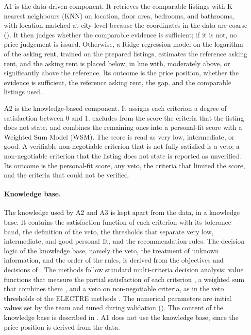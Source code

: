 \documentclass[12pt,a4paper]{report}
\begin{document}
A1 is the data-driven component. It retrieves the comparable listings with
K-nearest neighbours (KNN) on location, floor area, bedrooms, and bathrooms,
with location matched at city level because the coordinates in the data are
coarse (). It then judges whether the comparable evidence is sufficient; if it
is not, no price judgement is issued. Otherwise, a Ridge regression model
on the logarithm of the asking rent, trained on the prepared listings,
estimates the reference asking rent, and the asking rent is placed below,
in line with, moderately above, or significantly above the reference. Its outcome is the price position,
whether the evidence is sufficient, the reference asking rent, the gap, and
the comparable listings used.

A2 is the knowledge-based component. It assigns each criterion a degree of
satisfaction between 0 and 1, excludes from the score the criteria that the
listing does not state, and combines the remaining ones into a personal-fit
score with a Weighted Sum Model (WSM). The score is read as very low,
intermediate, or good. A verifiable non-negotiable criterion that is not
fully satisfied is a veto; a non-negotiable criterion that the listing does
not state is reported as unverified. Its outcome is the personal-fit score,
any veto, the criteria that limited the score, and the criteria that could
not be verified.

\paragraph{Knowledge base.} The knowledge used by A2 and A3 is kept apart
from the data, in a knowledge base. It contains the satisfaction function
of each criterion with its tolerance band, the definition of the veto, the
thresholds that separate very low, intermediate, and good personal fit, and
the recommendation rules. The decision logic of the knowledge base, namely
the veto, the treatment of unknown information, and the order of the
rules, is derived from the objectives and decisions of
. The methods follow standard multi-criteria
decision analysis: value functions that measure the partial satisfaction
of each criterion \cite{keeney_raiffa_1976}, a weighted sum that combines
them \cite{triantaphyllou_2000}, and a veto on non-negotiable criteria, as
in the veto thresholds of the ELECTRE methods \cite{roy_1991}. The
numerical parameters are initial values set by the team and tuned during
validation (). The content of the knowledge base is
described in . A1 does not use the knowledge base, since the price
position is derived from the data.
\end{document}
